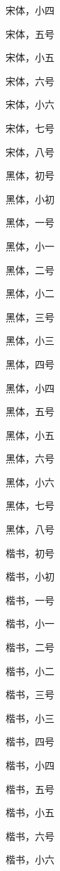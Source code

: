 {\songti{} 宋体，小四}

{\songti{} 宋体，五号}

{\songti{} 宋体，小五}

{\songti{} 宋体，六号}

{\songti{} 宋体，小六}

{\songti{} 宋体，七号}

{\songti{} 宋体，八号}

{\heiti{} 黑体，初号}

{\heiti{} 黑体，小初}

{\heiti{} 黑体，一号}

{\heiti{} 黑体，小一}

{\heiti{} 黑体，二号}

{\heiti{} 黑体，小二}

{\heiti{} 黑体，三号}

{\heiti{} 黑体，小三}

{\heiti{} 黑体，四号}

{\heiti{} 黑体，小四}

{\heiti{} 黑体，五号}

{\heiti{} 黑体，小五}

{\heiti{} 黑体，六号}

{\heiti{} 黑体，小六}

{\heiti{} 黑体，七号}

{\heiti{} 黑体，八号}

{\kaishu{} 楷书，初号}

{\kaishu{} 楷书，小初}

{\kaishu{} 楷书，一号}

{\kaishu{} 楷书，小一}

{\kaishu{} 楷书，二号}

{\kaishu{} 楷书，小二}

{\kaishu{} 楷书，三号}

{\kaishu{} 楷书，小三}

{\kaishu{} 楷书，四号}

{\kaishu{} 楷书，小四}

{\kaishu{} 楷书，五号}

{\kaishu{} 楷书，小五}

{\kaishu{} 楷书，六号}

{\kaishu{} 楷书，小六}

